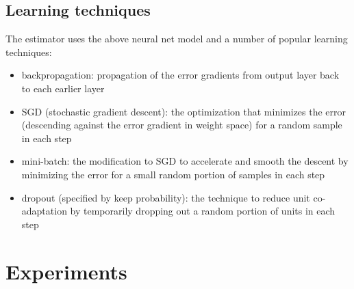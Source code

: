 \documentclass[twocolumn]{article}
\begin{document}
\subsection{Learning techniques}
The estimator uses the above neural net model and a number of popular learning 
techniques:
\begin{itemize}
	\item backpropagation: propagation of the error gradients from output layer 
	back to each earlier layer \cite{rumelhart1988learning}
	\item SGD (stochastic gradient descent): the optimization that minimizes 
	the error (descending against the error gradient in weight space) for a 
	random sample in each step \cite{lecun2012efficient}
	\item mini-batch: the modification to SGD to accelerate and smooth the 
	descent by minimizing the error for a small random portion of samples in 
	each step \cite{mairal2010online}
	\item dropout (specified by keep probability): the technique to reduce unit 
	co-adaptation by temporarily dropping out a random portion of units in each 
	step \cite{srivastava2014dropout}
\end{itemize}

\section{Experiments}
\end{document}
